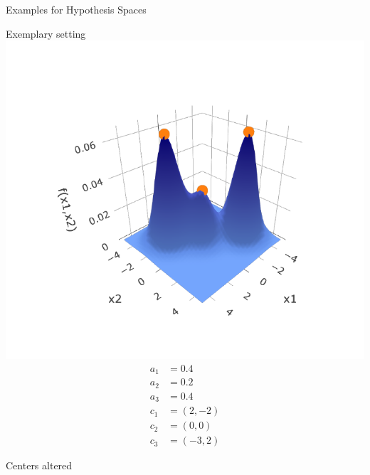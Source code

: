 \documentclass[11pt,compress,t,notes=noshow, xcolor=table]{beamer}
\begin{document}
\begin{vbframe}{Examples for Hypothesis Spaces}
\normalsize

\framebreak


\footnotesize

\begin{minipage}{0.33\textwidth}
  \begin{center}
      Exemplary setting
      \includegraphics[width=\textwidth]{figure/hs-rbf-network-3d-1.pdf}
      \begin{equation*}
        \begin{split}
          a_1 &= 0.4 \\
          a_2 &= 0.2 \\
          a_3 &= 0.4 \\
          c_1 &= (2,-2) \\
          c_2 &= (0,0) \\
          c_3 &= (-3,2)
        \end{split}
      \end{equation*}
    \end{center}
\end{minipage}%
\begin{minipage}{0.33\textwidth}
  \begin{center}
      Centers altered

\end{center}
\end{minipage}
\end{vbframe}
\end{document}
